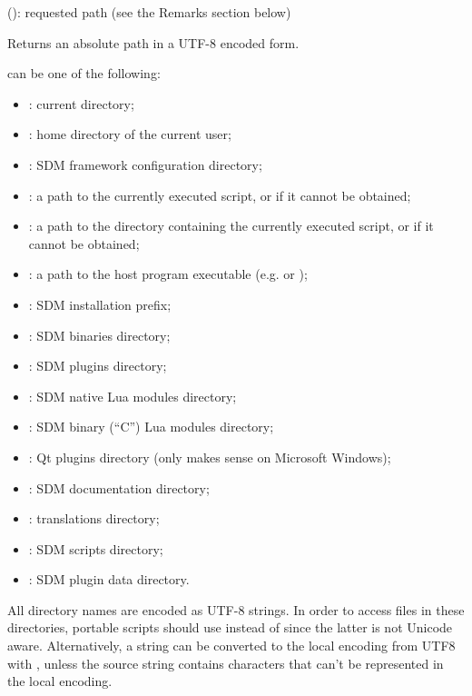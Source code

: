\documentclass[a4paper,12pt,twoside,extrafontsizes]{memoir}
\begin{document}
\begin{funcparams}
	 (): requested path (see the Remarks section below)
\end{funcparams}

\begin{funcret}
	Returns an absolute path in a UTF-8 encoded form.
\end{funcret}

\begin{funcremarks}
	 can be one of the following:
	
	\begin{itemize}
		\item {}: current directory;
		\item {}: home directory of the current user;
		\item {}: SDM framework configuration directory;
		\item {}: a path to the currently executed script, or  if it cannot be obtained;
		\item {}: a path to the directory containing the currently executed script, or  if it cannot be obtained;
		\item {}: a path to the host program executable (e.g.  or );
		\item {}: SDM installation prefix;
		\item {}: SDM binaries directory;
		\item {}: SDM plugins directory;
		\item {}: SDM native Lua modules directory;
		\item {}: SDM binary (``C'') Lua modules directory;
		\item {}: Qt plugins directory (only makes sense on Microsoft Windows);
		\item {}: SDM documentation directory;
		\item {}:  translations directory;
		\item {}: SDM scripts directory;
		\item {}: SDM plugin data directory.
	\end{itemize}

	All directory names are encoded as UTF-8 strings. In order to access files in these directories, portable scripts should use  instead of  since the latter is not Unicode aware. Alternatively, a string can be converted to the local encoding from UTF8 with , unless the source string contains characters that can't be represented in the local encoding.
\end{funcremarks}
\end{document}
